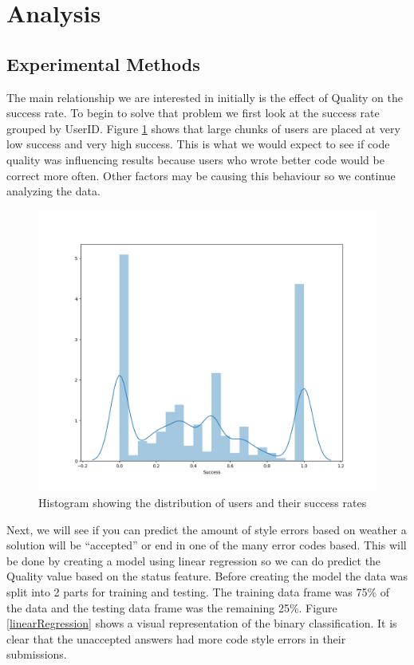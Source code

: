 \documentclass{article}
\begin{document}
\section{Analysis}\label{analysis}

\subsection{Experimental Methods}\label{experimental-methods}

The main relationship we are interested in initially is the effect of
Quality on the success rate. To begin to solve that problem we first
look at the success rate grouped by UserID. Figure \ref{uservsuccess}
shows that large chunks of users are placed at very low success and very
high success. This is what we would expect to see if code quality was
influencing results because users who wrote better code would be correct
more often. Other factors may be causing this behaviour so we continue
analyzing the data.

\begin{figure}[ht] \vskip 0.2in \begin{center}
\centerline{\includegraphics[width=\columnwidth]{../images/UserVsSuccess.png}}
\caption{ Histogram showing the distribution of users and their success rates } \label{uservsuccess} \end{center} \vskip -0.2in \end{figure}

Next, we will see if you can predict the amount of style errors based on
weather a solution will be ``accepted'' or end in one of the many error
codes based. This will be done by creating a model using linear
regression so we can do predict the Quality value based on the status
feature. Before creating the model the data was split into 2 parts for
training and testing. The training data frame was 75\% of the data and
the testing data frame was the remaining 25\%. Figure
\ref{linearRegression} shows a visual representation of the binary
classification. It is clear that the unaccepted answers had more code
style errors in their submissions.
\end{document}
